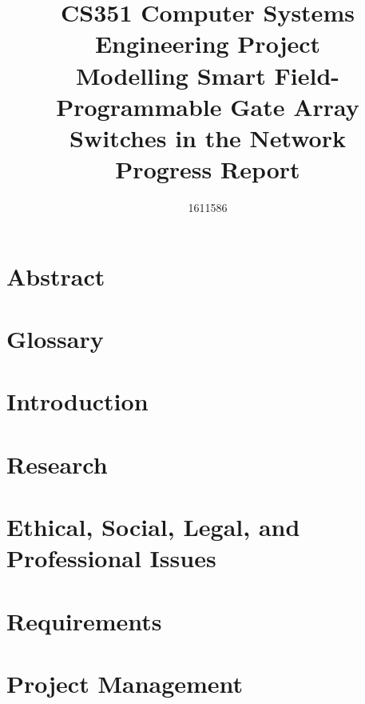 \documentclass[
  12pt,
  a4paper,
  twoside,
  onecolumn,
  appendixprefix=true,
  toc=chapterentrywithdots,
  toc=bibliography
]{scrreprt}
\title{CS351 Computer Systems Engineering Project \\ \vspace{0.5cm} Modelling Smart Field-Programmable Gate Array Switches in the Network \\ \vspace{0.3cm} \Large{Progress Report}}
\author{1611586}
\begin{document}
\renewcommand{\sfdefault}{cmr}




\onehalfspacing
{}

{}
{}
\chapter*{Abstract}
\label{abstract}


\newpage

{}
\chapter*{Glossary}
\label{glossary}


\tableofcontents

\listoffigures

\listoftables

\newpage


\chapter{Introduction}
\label{introduction}


\chapter{Research}
\label{research}


\chapter{Ethical, Social, Legal, and Professional Issues}
\label{issues}


\chapter{Requirements}
\label{requirements}


\chapter{Project Management}
\label{project_management}

\end{document}
